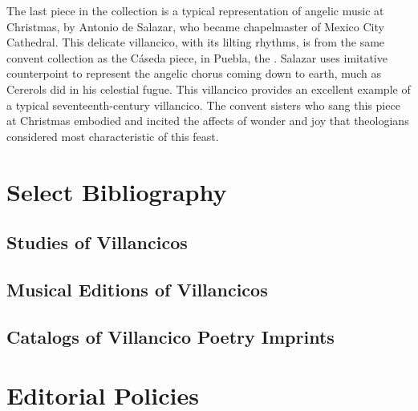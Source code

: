 The last piece in the collection is a typical representation of angelic music at Christmas, by Antonio de Salazar, who became chapelmaster of Mexico City Cathedral.
This delicate villancico, with its lilting rhythms, is from the same convent collection as the Cáseda piece, in Puebla, the .
Salazar uses imitative counterpoint to represent the angelic chorus coming down to earth, much as Cererols did in his celestial fugue. 
This villancico provides an excellent example of a typical seventeenth-century villancico.
The convent sisters who sang this piece at Christmas embodied and incited the affects of wonder and joy that theologians considered most characteristic of this feast.

\section{Select Bibliography}

\subsection{Studies of Villancicos}
\nocite{Rubio:Forma}
\nocite{Laird:VC}
\nocite{Torrente:PhD}
\nocite{Tenorio:SorJuana}
\nocite{CaberoPueyo:PhD}
\nocite{Illari:Polychoral}
\nocite{Knighton-Torrente:VCs}
\nocite{Cashner:Cards}
\printbibliography[heading=none,filter=villancico-studies]

\subsection{Musical Editions of Villancicos}
\nocite{Cererols:MEM-VC}
\nocite{Stevenson:Christmas}
\nocite{Ruimonte:Parnaso}
\nocite{Padilla:Tello}
\nocite{Ezquerro:MME55}
\nocite{RuizSamaniego:MME63}
\nocite{Ezquerro:MME59}
\nocite{Ezquerro:MME65}
\nocite{Fernandez:Cancionero}
\nocite{Torrejon:VCs}
\printbibliography[heading=none,filter=villancico-editions]

\subsection{Catalogs of Villancico Poetry Imprints}
\nocite{BNE:VCs17C}
\nocite{BNE:VCs18C}
\nocite{UK:VCs}
\nocite{US:VCs}
\printbibliography[heading=none,filter=villancico-imprint-catalogs]

\section{Editorial Policies}

